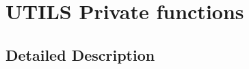 \hypertarget{group___u_t_i_l_s___l_l___private___functions}{}\section{U\+T\+I\+LS Private functions}
\label{group___u_t_i_l_s___l_l___private___functions}


\subsection{Detailed Description}
